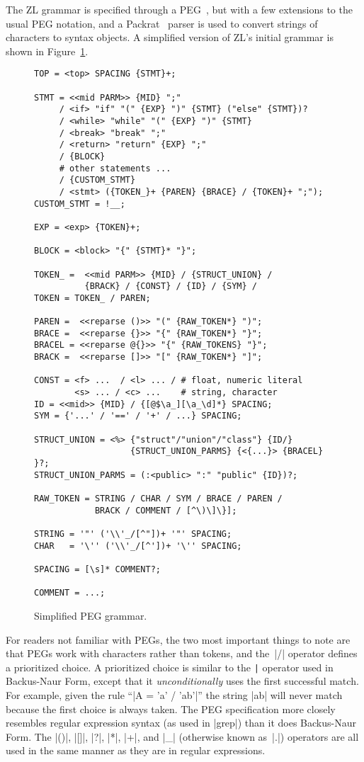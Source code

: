 The ZL grammar is specified through a PEG~\cite{peg}, but with a few
extensions to the usual PEG notation, and a Packrat~\cite{peg-p} parser is used to
convert strings of characters to syntax objects.  A simplified version
of ZL's initial grammar is shown in Figure~\ref{grammar}.  
\begin{figure}
\begin{Verbatim}[baselinestretch=1,fontsize=\small]
TOP = <top> SPACING {STMT}+;

STMT = <<mid PARM>> {MID} ";"
     / <if> "if" "(" {EXP} ")" {STMT} ("else" {STMT})?
     / <while> "while" "(" {EXP} ")" {STMT}
     / <break> "break" ";"
     / <return> "return" {EXP} ";"
     / {BLOCK}
     # other statements ...
     / {CUSTOM_STMT}
     / <stmt> ({TOKEN_}+ {PAREN} {BRACE} / {TOKEN}+ ";");
CUSTOM_STMT = !__;

EXP = <exp> {TOKEN}+;

BLOCK = <block> "{" {STMT}* "}";

TOKEN_ =  <<mid PARM>> {MID} / {STRUCT_UNION} / 
          {BRACK} / {CONST} / {ID} / {SYM} / 
TOKEN = TOKEN_ / PAREN;

PAREN =  <<reparse ()>> "(" {RAW_TOKEN*} ")";
BRACE =  <<reparse {}>> "{" {RAW_TOKEN*} "}";
BRACEL = <<reparse @{}>> "{" {RAW_TOKENS} "}";
BRACK =  <<reparse []>> "[" {RAW_TOKEN*} "]";

CONST = <f> ...  / <l> ... / # float, numeric literal
        <s> ... / <c> ...    # string, character
ID = <<mid>> {MID} / {[@$\a_][\a_\d]*} SPACING;
SYM = {'...' / '==' / '+' / ...} SPACING;

STRUCT_UNION = <%> {"struct"/"union"/"class"} {ID/}
                   {STRUCT_UNION_PARMS} {<{...}> {BRACEL} }?;
STRUCT_UNION_PARMS = (:<public> ":" "public" {ID})?;

RAW_TOKEN = STRING / CHAR / SYM / BRACE / PAREN / 
            BRACK / COMMENT / [^\)\]\}];

STRING = '"' ('\\'_/[^"])+ '"' SPACING;
CHAR   = '\'' ('\\'_/[^'])+ '\'' SPACING;

SPACING = [\s]* COMMENT?;

COMMENT = ...;
\end{Verbatim}
\caption{Simplified PEG grammar.}
\label{grammar}
\end{figure}

For readers not familiar with PEGs, the two most important things to
note are that PEGs work with characters rather than tokens, and
the~|/| operator defines a prioritized choice.  A prioritized choice
is similar to the \verb/|/ operator used in Backus-Naur Form, except
that it \textit{unconditionally} uses the first successful match.  For
example, given the rule ``|A = 'a' / 'ab'|'' the string |ab| will
never match because the first choice is always taken.  The PEG
specification more closely resembles regular expression syntax (as
used in |grep|) than it does Backus-Naur Form. The |()|, |[]|, |?|,
|*|, |+|, and |_| (otherwise known as~|.|) operators are all used in
the same manner as they are in regular expressions.


